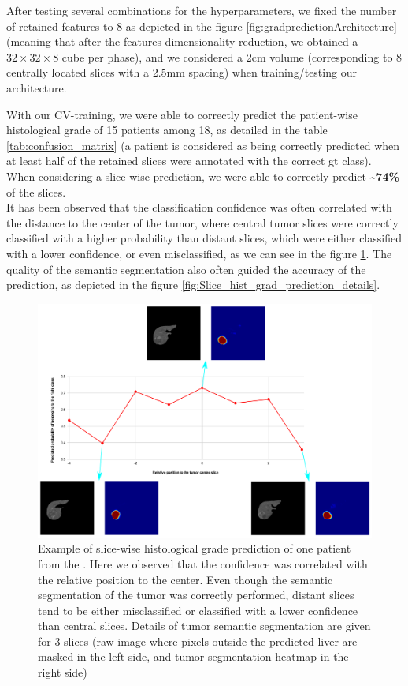 After testing several combinations for the hyperparameters, we
fixed the number of retained features to 8 as depicted in the
figure \ref{fig:gradpredictionArchitecture} (meaning that after the features dimensionality reduction,
we obtained a $ 32\times32\times8 $ cube per phase), and we considered a 2cm volume
(corresponding to 8 centrally located slices with a 2.5mm spacing) when
training/testing our architecture.

With our CV-training, we were able to correctly predict the patient-wise
histological grade of 15 patients among 18, as detailed in the table \ref{tab:confusion_matrix} (a patient is considered as being correctly predicted
when at least half of the retained slices were annotated with the
correct \ac{gt} class).
When considering a slice-wise prediction, we were able to correctly
predict \textbf{\textasciitilde{}74\%} of the slices.\\
It has been observed that the classification confidence was often correlated with the distance to the center of the tumor, where central tumor slices were correctly classified with a higher probability than distant slices, which were either classified with a lower confidence, or even misclassified, as we can see in the figure \ref{fig:Slice_hist_grad_prediction_2}. The quality of the semantic segmentation also often guided the accuracy of the prediction, as depicted in the figure \ref{fig:Slice_hist_grad_prediction_details}.

\begin{figure}[th!]
\centering
\includegraphics[width=0.7\linewidth]{HistologicalGradePrediction/images/Slice_hist_grad_prediction_2}
\caption{Example of slice-wise histological grade prediction of one patient from the . Here we observed that the confidence was correlated with the relative position to the center. Even though the semantic segmentation of the tumor was correctly performed, distant slices tend to be either misclassified or classified with a lower confidence than central slices. Details of tumor semantic segmentation are given for 3 slices (raw image where pixels outside the predicted liver are masked in the left side, and tumor segmentation heatmap in the right side)}
\label{fig:Slice_hist_grad_prediction_2}
\end{figure}


